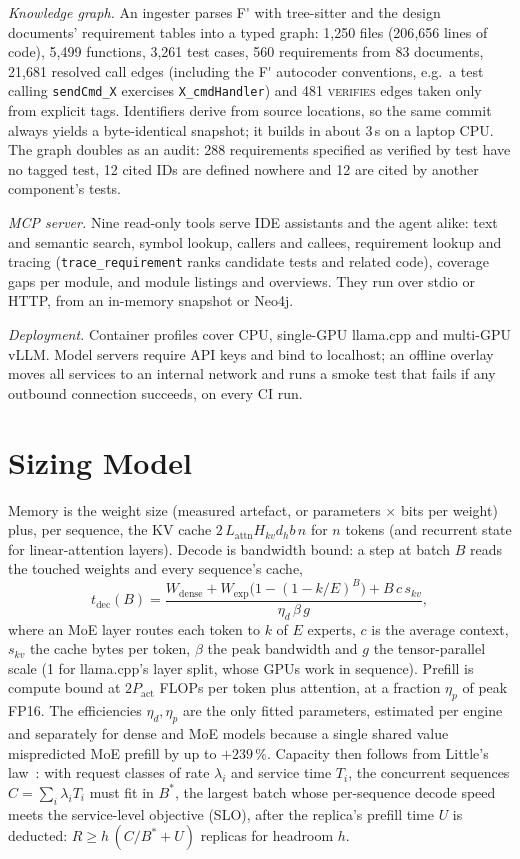 \documentclass[conference]{IEEEtran}
\newcommand{\Fp}{F\'{}}  %
\newcommand{\tool}[1]{\texttt{#1}}
\begin{document}
\emph{Knowledge graph.} An ingester parses \Fp{} with tree-sitter and the design documents' requirement tables
into a typed graph: 1{,}250 files (206{,}656 lines of code), 5{,}499 functions, 3{,}261 test cases, 560
requirements from 83 documents, 21{,}681 resolved call edges (including the \Fp{} autocoder conventions, e.g.\ a
test calling \tool{sendCmd\_X} exercises \tool{X\_cmdHandler}) and 481 \textsc{verifies} edges taken only from
explicit tags. Identifiers derive from source locations, so the same commit always yields a byte-identical
snapshot; it builds in about 3\,s on a laptop CPU. The graph doubles as an audit: 288 requirements specified as
verified by test have no tagged test, 12 cited IDs are defined nowhere and 12 are cited by another component's
tests.

\emph{MCP server.} Nine read-only tools serve IDE assistants and the agent alike: text and semantic search,
symbol lookup, callers and callees, requirement lookup and tracing (\tool{trace\_requirement} ranks candidate
tests and related code), coverage gaps per module, and module listings and overviews. They run over stdio or HTTP,
from an in-memory snapshot or Neo4j.

\emph{Deployment.} Container profiles cover CPU, single-GPU llama.cpp and multi-GPU vLLM. Model servers require API
keys and bind to localhost; an offline overlay moves all services to an internal network and runs a smoke test
that fails if any outbound connection succeeds, on every CI run.

\section{Sizing Model}\label{sec:sizing}
Memory is the weight size (measured artefact, or parameters $\times$ bits per weight) plus, per sequence, the KV
cache $2\,L_{\mathrm{attn}} H_{kv} d_h b\,n$ for $n$ tokens (and recurrent state for linear-attention layers).
Decode is bandwidth bound: a step at batch $B$ reads the touched weights and every sequence's cache,
\begin{equation}
t_{\mathrm{dec}}(B) = \frac{W_{\mathrm{dense}} + W_{\mathrm{exp}}\bigl(1-(1-k/E)^{B}\bigr) + B\,c\,s_{kv}}
{\eta_{d}\,\beta\,g},
\label{eq:decode}
\end{equation}
where an MoE layer routes each token to $k$ of $E$ experts, $c$ is the average context, $s_{kv}$ the cache bytes
per token, $\beta$ the peak bandwidth and $g$ the tensor-parallel scale (1 for llama.cpp's layer split, whose GPUs
work in sequence). Prefill is compute bound at $2P_{\mathrm{act}}$ FLOPs per token plus attention, at a fraction
$\eta_p$ of peak FP16. The efficiencies $\eta_d, \eta_p$ are the only fitted parameters, estimated per engine and
separately for dense and MoE models because a single shared value mispredicted MoE prefill by up to $+239\,\%$. Capacity then
follows from Little's law~\cite{little1961}: with request classes of rate $\lambda_i$ and service time $T_i$, the
concurrent sequences $C=\sum_i \lambda_i T_i$ must fit in $B^{*}$, the largest batch whose per-sequence decode speed
meets the service-level objective (SLO), after the replica's prefill time $U$ is deducted:
$R \ge h\,(C/B^{*} + U)$ replicas for headroom $h$.
\end{document}
